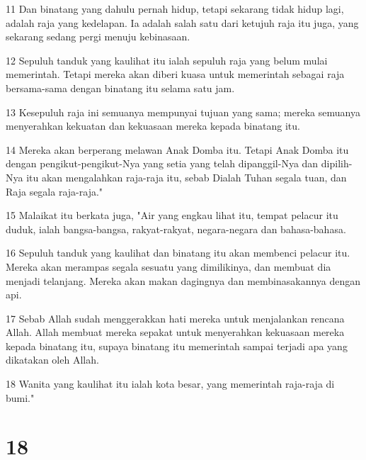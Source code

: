 \par 11 Dan binatang yang dahulu pernah hidup, tetapi sekarang tidak hidup lagi, adalah raja yang kedelapan. Ia adalah salah satu dari ketujuh raja itu juga, yang sekarang sedang pergi menuju kebinasaan.
\par 12 Sepuluh tanduk yang kaulihat itu ialah sepuluh raja yang belum mulai memerintah. Tetapi mereka akan diberi kuasa untuk memerintah sebagai raja bersama-sama dengan binatang itu selama satu jam.
\par 13 Kesepuluh raja ini semuanya mempunyai tujuan yang sama; mereka semuanya menyerahkan kekuatan dan kekuasaan mereka kepada binatang itu.
\par 14 Mereka akan berperang melawan Anak Domba itu. Tetapi Anak Domba itu dengan pengikut-pengikut-Nya yang setia yang telah dipanggil-Nya dan dipilih-Nya itu akan mengalahkan raja-raja itu, sebab Dialah Tuhan segala tuan, dan Raja segala raja-raja."
\par 15 Malaikat itu berkata juga, "Air yang engkau lihat itu, tempat pelacur itu duduk, ialah bangsa-bangsa, rakyat-rakyat, negara-negara dan bahasa-bahasa.
\par 16 Sepuluh tanduk yang kaulihat dan binatang itu akan membenci pelacur itu. Mereka akan merampas segala sesuatu yang dimilikinya, dan membuat dia menjadi telanjang. Mereka akan makan dagingnya dan membinasakannya dengan api.
\par 17 Sebab Allah sudah menggerakkan hati mereka untuk menjalankan rencana Allah. Allah membuat mereka sepakat untuk menyerahkan kekuasaan mereka kepada binatang itu, supaya binatang itu memerintah sampai terjadi apa yang dikatakan oleh Allah.
\par 18 Wanita yang kaulihat itu ialah kota besar, yang memerintah raja-raja di bumi."

\chapter{18}

